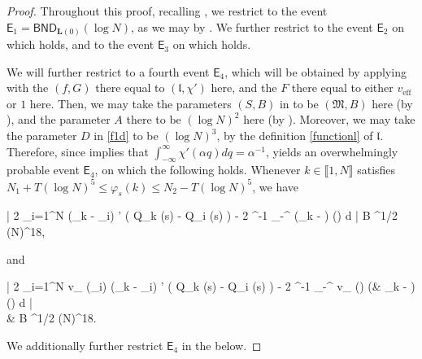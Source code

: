 \documentclass{amsart}
\numberwithin{equation}{section}
\DeclareMathOperator{\eff}{eff}
\theoremstyle{remark}
\theoremstyle{definition}
\begin{document}
	
	\begin{proof}
		
		Throughout this proof, recalling , we restrict to the event $\mathsf{E}_1  = \mathsf{BND}_{\bm{L}(0)} (\log N)$, as we may by . We further restrict to the event $\mathsf{E}_2$ on which  holds, and to the event $\mathsf{E}_3$ on which  holds.
		
		We will further restrict to a fourth event $\mathsf{E}_4$, which will be obtained by applying  with the $(f, G)$ there equal to $(\mathfrak{l}, \chi')$ here, and the $F$ there equal to either $v_{\eff}$ or $1$ here. Then, we may take the parameters $(S, B)$ in  to be $(\mathfrak{M}, B)$ here (by ), and the parameter $A$ there to be $(\log N)^2$ here (by ). Moreover, we may take the parameter $D$ in \eqref{f1d} to be $(\log N)^3$, by the definition \eqref{functionl} of $\mathfrak{l}$. Therefore, since  implies that $\int_{-\infty}^{\infty} \chi'(\alpha q) dq = \alpha^{-1}$,  yields an overwhelmingly probable event $\mathsf{E}_4$, on which the following holds. Whenever $k \in \llbracket 1, N \rrbracket$ satisfies $N_1 + T(\log N)^5 \le \varphi_s (k) \le N_2 - T (\log N)^5$, we have
		\begin{flalign}
			\label{2q0} 
			\Bigg| 2 \displaystyle\sum_{i=1}^N  (\lambda_k - \lambda_i) \cdot \chi' \big( Q_k (s) - Q_i (s) \big) - 2 \alpha^{-1} \displaystyle\int_{-\infty}^{\infty}  (\lambda_k - \lambda) \varrho (\lambda) d \lambda \Bigg| \le 	B ^{1/2} (\log N)^{18},
		\end{flalign} 
		
		\noindent and 
		\begin{flalign}
			\label{3q0} 
			\begin{aligned} 
			\Bigg| 2 \displaystyle\sum_{i=1}^N v_{\eff} (\lambda_i) \cdot {} (\lambda_k - \lambda_i) \cdot \chi' \big( Q_k (s) - Q_i (s) \big) - 2 \alpha^{-1} \displaystyle\int_{-\infty}^{\infty} v_{\eff} (\lambda)  (& \lambda_k - \lambda) \varrho (\lambda) d \lambda \Bigg| \\
			& \le 	B ^{1/2} (\log N)^{18}.
			\end{aligned} 
		\end{flalign}
		
		\noindent We additionally further restrict $\mathsf{E}_4$ in the below.
		

\end{proof}
\end{document}
